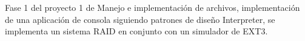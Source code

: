 Fase 1 del proyecto 1 de Manejo e implementación de archivos, implementación de una aplicación de consola siguiendo patrones de diseño Interpreter, se implementa un sistema R\+A\+ID en conjunto con un simulador de E\+X\+T3. 
